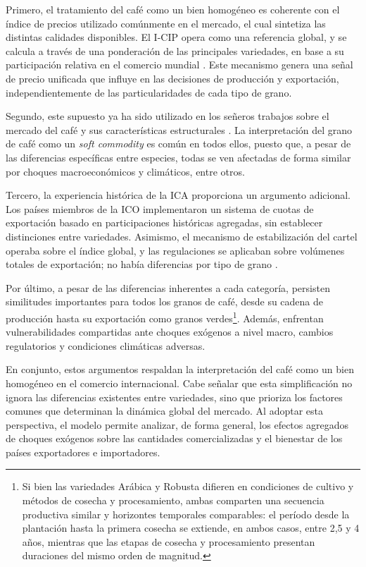 Primero, el tratamiento del café como un bien homogéneo es coherente con el índice de precios utilizado comúnmente en el mercado, el cual sintetiza las distintas calidades disponibles. El I-CIP opera como una referencia global, y se calcula a través de una ponderación de las principales variedades, en base a su participación relativa en el comercio mundial \citep{ICIP2024}. Este mecanismo genera una señal de precio unificada que influye en las decisiones de producción y exportación, independientemente de las particularidades de cada tipo de grano.

Segundo, este supuesto ya ha sido utilizado en los señeros trabajos sobre el mercado del café y sus características estructurales \citep{igami2015market}. La interpretación del grano de café como un \textit{soft commodity} es común en todos ellos, puesto que, a pesar de las diferencias específicas entre especies, todas se ven afectadas de forma similar por choques macroeconómicos y climáticos, entre otros.

Tercero, la experiencia histórica de la ICA proporciona un argumento adicional. Los países miembros de la ICO implementaron un sistema de cuotas de exportación basado en participaciones históricas agregadas, sin establecer distinciones entre variedades. Asimismo, el mecanismo de estabilización del cartel operaba sobre el índice global, y las regulaciones se aplicaban sobre volúmenes totales de exportación; no había diferencias por tipo de grano \citep{igami2015market}. 

Por último, a pesar de las diferencias inherentes a cada categoría, persisten similitudes importantes para todos los granos de café, desde su cadena de producción hasta su exportación como granos verdes\footnote{Si bien las variedades Arábica y Robusta difieren en condiciones de cultivo y métodos de cosecha y procesamiento, ambas comparten una secuencia productiva similar y horizontes temporales comparables: el período desde la plantación hasta la primera cosecha se extiende, en ambos casos, entre 2,5 y 4 años, mientras que las etapas de cosecha y procesamiento presentan duraciones del mismo orden de magnitud.}. Además, enfrentan vulnerabilidades compartidas ante choques exógenos a nivel macro, cambios regulatorios y condiciones climáticas adversas.

En conjunto, estos argumentos respaldan la interpretación del café como un bien homogéneo en el comercio internacional. Cabe señalar que esta simplificación no ignora las diferencias existentes entre variedades, sino que prioriza los factores comunes que determinan la dinámica global del mercado. Al adoptar esta perspectiva, el modelo permite analizar, de forma general, los efectos agregados de choques exógenos sobre las cantidades comercializadas y el bienestar de los países exportadores e importadores.

